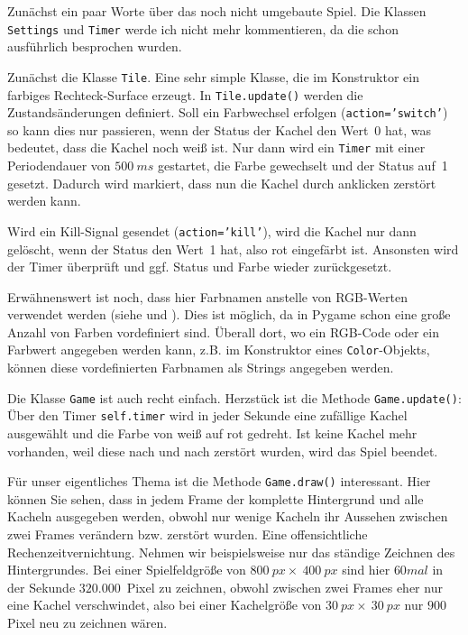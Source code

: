 Zunächst ein paar Worte über das noch nicht umgebaute Spiel. Die Klassen \texttt{Settings} und \texttt{Timer} werde ich nicht mehr kommentieren, da die schon ausführlich besprochen wurden. 

Zunächst die Klasse \texttt{Tile}. Eine sehr simple Klasse, die im Konstruktor ein farbiges Rechteck-Surface erzeugt. In \texttt{Tile.update()} werden die Zustandsänderungen definiert. Soll ein Farbwechsel erfolgen (\texttt{action='switch'}) so kann dies nur passieren, wenn der Status der Kachel den Wert~0 hat, was bedeutet, dass die Kachel noch weiß ist. Nur dann wird ein \texttt{Timer} mit einer Periodendauer von $500~ms$ gestartet, die Farbe gewechselt und der Status auf~1 gesetzt. Dadurch wird markiert, dass nun die Kachel durch anklicken zerstört werden kann.

Wird ein Kill-Signal gesendet (\texttt{action='kill'}), wird die Kachel nur dann gelöscht, wenn der Status den Wert~1 hat, also rot eingefärbt ist. Ansonsten wird der Timer überprüft und ggf. Status und Farbe wieder zurückgesetzt.

Erwähnenswert ist noch, dass hier Farbnamen anstelle von RGB-Werten verwendet werden (siehe  und ). Dies ist möglich, da in Pygame schon eine große Anzahl von Farben vordefiniert sind. Überall dort, wo ein RGB-Code oder ein Farbwert angegeben werden kann, z.B. im Konstruktor eines \texttt{Color}-Objekts, können diese vordefinierten Farbnamen als Strings angegeben werden.


Die Klasse \texttt{Game} ist auch recht einfach. Herzstück ist die Methode \texttt{Game.update()}: Über den Timer \texttt{self.timer} wird in jeder Sekunde eine zufällige Kachel ausgewählt und die Farbe von weiß auf rot gedreht. Ist keine Kachel mehr vorhanden, weil diese nach und nach zerstört wurden, wird das Spiel beendet.

Für unser eigentliches Thema ist die Methode \texttt{Game.draw()} interessant. Hier können Sie sehen, dass in jedem Frame der komplette Hintergrund und alle Kacheln ausgegeben werden, obwohl nur wenige Kacheln ihr Aussehen zwischen zwei Frames verändern bzw. zerstört wurden. Eine offensichtliche Rechenzeitvernichtung. Nehmen wir beispielsweise nur das ständige Zeichnen des Hintergrundes. Bei einer Spielfeldgröße von $800~px\times~400~px$ sind hier $60mal$ in der Sekunde $320.000$~Pixel zu zeichnen, obwohl zwischen zwei Frames eher nur eine Kachel verschwindet, also bei einer Kachelgröße von $30~px\times~30~px$ nur $900$ Pixel neu zu zeichnen wären.

